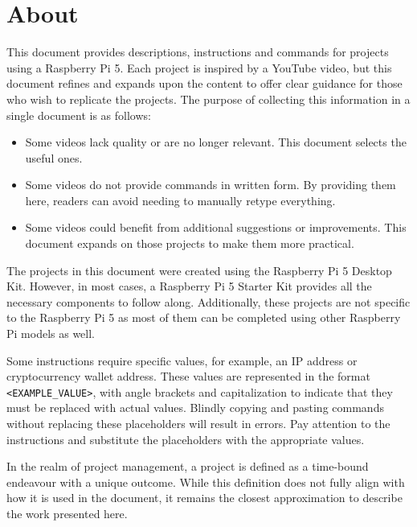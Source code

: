 \section*{ About}

This document provides descriptions, instructions and commands for projects using a Raspberry Pi 5. Each project is inspired by a YouTube video, but this document refines and expands upon the content to offer clear guidance for those who wish to replicate the projects. The purpose of collecting this information in a single document is as follows:

\begin{itemize}
\item Some videos lack quality or are no longer relevant. This document selects the useful ones.
\item Some videos do not provide commands in written form. By providing them here, readers can avoid needing to manually retype everything.
\item Some videos could benefit from additional suggestions or improvements. This document expands on those projects to make them more practical.
\end{itemize}

The projects in this document were created using the Raspberry Pi 5 Desktop Kit. However, in most cases, a Raspberry Pi 5 Starter Kit provides all the necessary components to follow along. Additionally, these projects are not specific to the Raspberry Pi 5 as most of them can be completed using other Raspberry Pi models as well.  

Some instructions require specific values, for example, an IP address or cryptocurrency wallet address. These values are represented in the format \texttt{\textless EXAMPLE\_VALUE\textgreater}, with angle brackets and capitalization to indicate that they must be replaced with actual values. Blindly copying and pasting commands without replacing these placeholders will result in errors. Pay attention to the instructions and substitute the placeholders with the appropriate values.

In the realm of project management, a project is defined as a time-bound endeavour with a unique outcome. While this definition does not fully align with how it is used in the document, it remains the closest approximation to describe the work presented here.